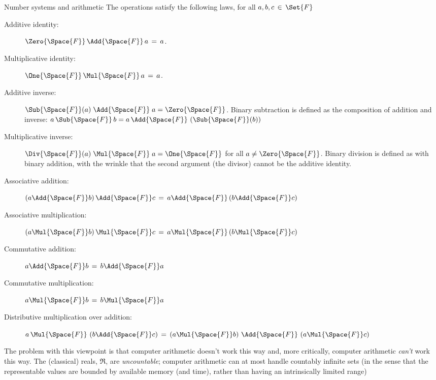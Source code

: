 \documentclass[12pt]{PalisadesLakesBook}
\begin{document}
\begin{plSection}{Number systems and arithmetic}
The operations satisfy the following laws, for all 
$a, b, c \,\in \, \Set{F}$
\begin{description}

\item[Additive identity:] 
$\Zero{\Space{F}} \,\Add{\Space{F}}\, a \,=\, a$.

\item[Multiplicative identity:] 
$\One{\Space{F}} \,\Mul{\Space{F}}\, a \,=\, a$.

\item[Additive inverse:] 
$\Sub{\Space{F}}(a) \;\Add{\Space{F}}\; a = \Zero{\Space{F}}$.
Binary subtraction is defined as the composition 
of addition and inverse:
$a \,\Sub{\Space{F}}\, b = 
a \,\Add{\Space{F}}\, \left(\Sub{\Space{F}}(b)\right) $

\item[Multiplicative inverse:] 
$\Div{\Space{F}}(a) \;\Mul{\Space{F}}\; a = \One{\Space{F}}$ for all $a \neq \Zero{\Space{F}}$.
Binary division is defined as with binary addition,
with the wrinkle that the second argument (the divisor)
cannot be the additive identity.

\item[Associative addition:] 
$\left( a \Add{\Space{F}} b \right)  \Add{\Space{F}} c 
\,=\, 
a  \Add{\Space{F}} \left( b  \Add{\Space{F}} c \right)$

\item[Associative multiplication:] 
$\left( a  \Mul{\Space{F}} b \right) \Mul{\Space{F}} c 
\,=\, 
a \Mul{\Space{F}} \left( b \Mul{\Space{F}} c \right)$

\item[Commutative addition:] 
$a \Add{\Space{F}} b \,=\, b \Add{\Space{F}} a$

\item[Commutative multiplication:] 
$a \Mul{\Space{F}} b \,=\, b \Mul{\Space{F}} a$

\item[Distributive multiplication over addition:] 
$a \, \Mul{\Space{F}} \, \left( b \Add{\Space{F}} c \right)
\,=\, 
\left(a \Mul{\Space{F}} b \right) 
\, \Add{\Space{F}} \, 
\left(a \Mul{\Space{F}} c \right)$

\end{description}

The problem with this viewpoint is that computer arithmetic
doesn't work this way
and, more critically, computer arithmetic \emph{can't} work
this way.
The (classical) reals, $\Re$, are \emph{uncountable};
computer arithmetic can at most handle countably infinite sets
(in the sense that the representable values are 
bounded by available memory (and time),
rather than having an intrinsically limited range)


\end{plSection}
\end{document}

